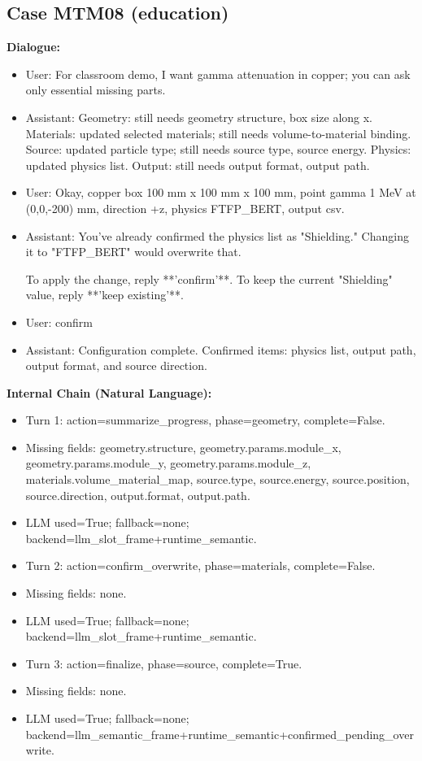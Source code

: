 \documentclass[11pt]{ctexart}
\begin{document}
\subsection{Case MTM08 (education)}
\textbf{Dialogue:}
\begin{itemize}
\item User: For classroom demo, I want gamma attenuation in copper; you can ask only essential missing parts.
\item Assistant: Geometry: still needs geometry structure, box size along x. Materials: updated selected materials; still needs volume-to-material binding. Source: updated particle type; still needs source type, source energy. Physics: updated physics list. Output: still needs output format, output path.
\item User: Okay, copper box 100 mm x 100 mm x 100 mm, point gamma 1 MeV at (0,0,-200) mm, direction +z, physics FTFP\_BERT, output csv.
\item Assistant: You've already confirmed the physics list as "Shielding." Changing it to "FTFP\_BERT" would overwrite that.

To apply the change, reply **'confirm'**.  
To keep the current "Shielding" value, reply **'keep existing'**.
\item User: confirm
\item Assistant: Configuration complete. Confirmed items: physics list, output path, output format, and source direction.
\end{itemize}
\textbf{Internal Chain (Natural Language):}
\begin{itemize}
\item Turn 1: action=summarize\_progress, phase=geometry, complete=False.
\item Missing fields: geometry.structure, geometry.params.module\_x, geometry.params.module\_y, geometry.params.module\_z, materials.volume\_material\_map, source.type, source.energy, source.position, source.direction, output.format, output.path.
\item LLM used=True; fallback=none; backend=llm\_slot\_frame+runtime\_semantic.
\item Turn 2: action=confirm\_overwrite, phase=materials, complete=False.
\item Missing fields: none.
\item LLM used=True; fallback=none; backend=llm\_slot\_frame+runtime\_semantic.
\item Turn 3: action=finalize, phase=source, complete=True.
\item Missing fields: none.
\item LLM used=True; fallback=none; backend=llm\_semantic\_frame+runtime\_semantic+confirmed\_pending\_overwrite.
\end{itemize}
\end{document}
